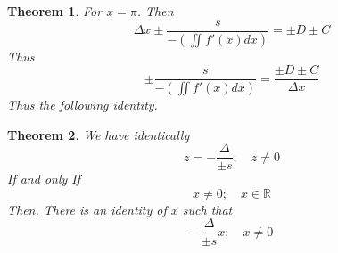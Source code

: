 \documentclass[11pt, a4paper]{article}
\theoremstyle{plain}
\newtheorem{theorem}{Theorem}[section]
\theoremstyle{definition}
\theoremstyle{remark}
\begin{document}
\begin{theorem}
For $x=\pi$. Then
\begin{equation}
  \Delta x \pm \frac{s}{-(\iint f'(x) dx)} = \pm D \pm C 
\end{equation}
Thus
\begin{equation}
  \pm \frac{s}{-(\iint f'(x) dx)} = \frac{\pm D \pm C}{\Delta x }
\end{equation}
Thus the following identity.
\end{theorem}

\begin{theorem}
We have identically
\begin{equation}
  z = -\frac{\Delta}{\pm s}; \quad z \neq 0
\end{equation}
If and only If
\begin{equation}
  x \neq 0; \quad x \in \mathbb{R}
\end{equation}
Then. There is an identity of $x$ such that
\begin{equation}
  -\frac{\Delta}{\pm s}x; \quad x \neq 0
\end{equation}
\end{theorem}
\end{document}
